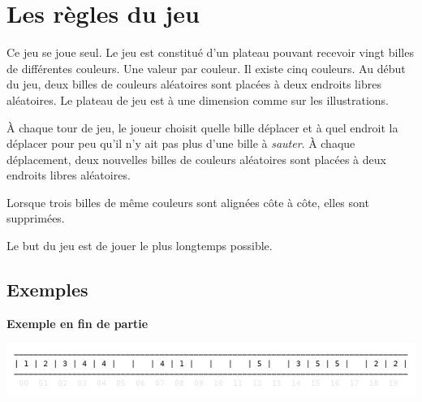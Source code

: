 \documentclass[a4paper,11pt]{style-esi/td}
\begin{document}

\section*{Les règles du jeu}


	Ce jeu se joue seul. Le jeu est constitué d'un plateau pouvant recevoir
	vingt billes de différentes couleurs. Une valeur par couleur. Il existe
	cinq couleurs. Au début du jeu, deux billes de couleurs aléatoires sont
	placées à deux endroits libres aléatoires. Le plateau de jeu est à une
	dimension comme sur les illustrations. 
			
	À chaque tour de jeu, le joueur choisit quelle bille déplacer et
	à quel endroit la déplacer pour peu qu'il n'y ait pas plus d'une
	bille à \textit{sauter}. À chaque déplacement, deux nouvelles billes de
	couleurs aléatoires sont placées à deux endroits libres aléatoires.

	Lorsque trois billes de même couleurs sont alignées côte à côte, elles
	sont supprimées. 

	Le but du jeu est de jouer le plus longtemps possible. 

\bigskip
\bigskip
\subsection*{Exemples}

\textbf{Exemple en fin de partie}

\includegraphics[width=.9\linewidth]{img/out-3.png}
\end{document}
